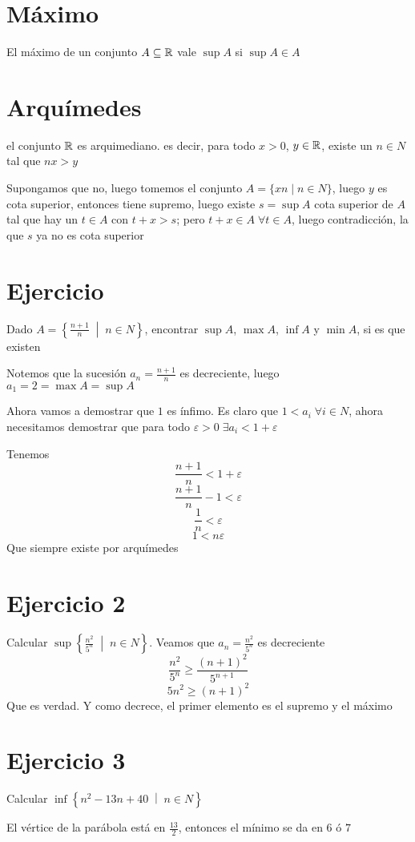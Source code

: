 \documentclass{article}
\begin{document}
\section{Máximo}
El máximo de un conjunto $A \subseteq \mathbb{R}$ vale $\sup A$ si $\sup A \in A$
\section{Arquímedes}
el conjunto $\mathbb{R}$ es arquimediano. es decir, para todo $x>0$, $y\in \mathbb{R}$, existe un $n \in N$
tal que $nx > y$

Supongamos que no, luego tomemos el conjunto $A = \{xn \mid n \in N\}$, luego $y$ es cota
superior, entonces tiene supremo, luego existe $s = \sup A$ cota superior de $A$
tal que hay un $t \in A$
con $t + x > s$; pero $t + x \in A \;\forall t \in A$, luego contradicción, la que $s$
ya no es cota superior

\section{Ejercicio}
Dado $A = \left\{\frac{n+1}{n} \;\middle|\; n \in N \right\}$, encontrar $\sup A$, $\max A$, $\inf A$ y $\min A$, si es que existen

Notemos que la sucesión $a_n = \frac{n+1}{n}$ es decreciente, luego $a_1 = 2 = \max A = \sup A$

Ahora vamos a demostrar que $1$ es ínfimo. Es claro que $1 < a_i \; \forall i \in N$, ahora necesitamos demostrar que para todo $\varepsilon > 0 \; \exists a_i < 1 + \varepsilon$

Tenemos
\[\frac{n+1}{n} < 1 + \varepsilon\]
\[\frac{n+1}{n} - 1 < \varepsilon\]
\[\frac{1}{n} < \varepsilon\]
\[1 < n\varepsilon\]
Que siempre existe por arquímedes

\section{Ejercicio 2}
Calcular $\sup \left\{\frac{n^2}{5^n} \;\middle|\; n \in N\right\}$.
Veamos que $a_n = \frac{n^2}{5^n}$ es decreciente
\[\frac{n^2}{5^n} \ge \frac{(n+1)^2}{5^{n+1}}\]
\[5n^2 \ge (n+1)^2\]
Que es verdad. Y como decrece, el primer elemento es el supremo y el máximo

\section{Ejercicio 3}
Calcular $\inf \left\{n^2 - 13n + 40 \;\middle|\; n \in N\right\}$

El vértice de la parábola está en $\frac{13}{2}$, entonces el mínimo se da en $6$ ó $7$
\end{document}
